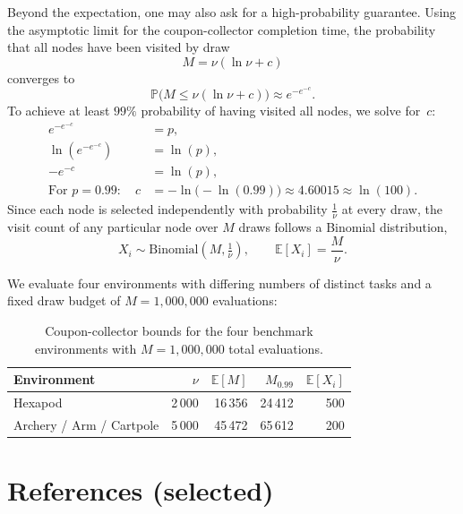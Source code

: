 \documentclass[11pt,a4paper]{article}
\begin{document}
\bigskip
Beyond the expectation, one may also ask for a high-probability
guarantee. Using the asymptotic limit for the coupon-collector
completion time, the probability that all nodes have been visited by
draw
\[
M = \nu(\ln \nu + c)
\]
converges to
\[
\mathbb{P}\bigl(M \le \nu(\ln \nu + c)\bigr) \approx e^{-e^{-c}}.
\]
To achieve at least $99\%$ probability of having visited all nodes,
we solve for~$c$:
\[
\begin{aligned}
e^{-e^{-c}} &= p, \\[4pt]
\ln\!\left(e^{-e^{-c}}\right) &= \ln(p), \\[4pt]
-e^{-c} &= \ln(p), \\[4pt]
\text{For } p = 0.99:\quad
c &= -\ln\!\bigl(-\ln(0.99)\bigr)
     \approx 4.60015 \approx \ln(100).
\end{aligned}
\]
Since each node is selected independently with probability
$\tfrac{1}{\nu}$ at every draw, the visit count of any particular
node over $M$ draws follows a Binomial distribution,
\[
X_i \sim \mathrm{Binomial}\!\left(M, \tfrac{1}{\nu}\right),
\qquad
\mathbb{E}[X_i] = \frac{M}{\nu}.
\]

We evaluate four environments with differing numbers of distinct
tasks and a fixed draw budget of $M=1{,}000{,}000$ evaluations:

\begin{table}[H]
\centering
\caption{Coupon-collector bounds for the four benchmark environments
with $M=1{,}000{,}000$ total evaluations.}
\label{tab:coupon-collector}
\begin{tabular}{@{}lrrrr@{}}
\toprule
Environment & $\nu$ & $\mathbb{E}[M]$ & $M_{0.99}$
   & $\mathbb{E}[X_i]$ \\
\midrule
Hexapod                  & 2\,000 & 16\,356 & 24\,412 & 500 \\
Archery / Arm / Cartpole & 5\,000 & 45\,472 & 65\,612 & 200 \\
\bottomrule
\end{tabular}
\end{table}

\section*{References (selected)}
\end{document}
